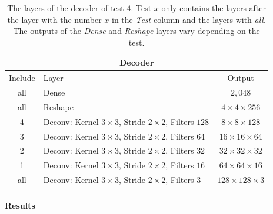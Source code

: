 \begin{center}
    \begin{table}[H]
        \centering
        \begin{tabular}{ | c | l | c | }
            \multicolumn{3}{c}{Decoder} \\ \hline
            Include &Layer & Output\\ \hline
            all &Dense                                                            & $2,048$                   \\
            all &Reshape                                                          & $4\times 4\times    256$  \\
            4   &Deconv: Kernel $3\times3$, Stride $2\times2$, Filters $128$      & $8\times 8\times    128$  \\
            3   &Deconv: Kernel $3\times3$, Stride $2\times2$, Filters $64 $      & $16\times 16\times  64 $  \\
            2   &Deconv: Kernel $3\times3$, Stride $2\times2$, Filters $32 $      & $32\times 32\times  32 $  \\
            1   &Deconv: Kernel $3\times3$, Stride $2\times2$, Filters $16 $      & $64\times 64\times  16 $  \\
            all &Deconv: Kernel $3\times3$, Stride $2\times2$, Filters $3  $      & $128\times 128\times3  $  \\
            \hline
        \end{tabular}
        \caption{The layers of the decoder of test $4$. 
        Test $x$ only contains the layers after the layer with the number
        $x$ in the \textit{Test} column and the layers with \textit{all}.
        The outputs of the \textit{Dense} and \textit{Reshape}
        layers vary depending on the test.} 
    \end{table}
\end{center}

\paragraph{Results} \mbox{}\\


